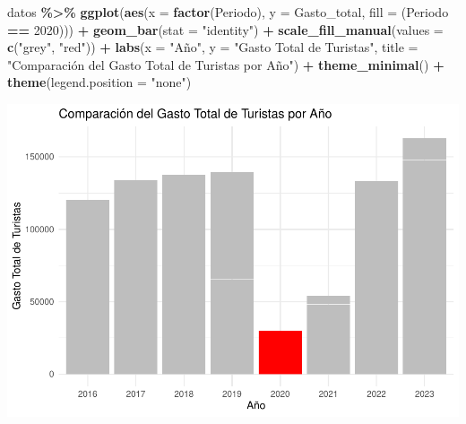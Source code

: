 \documentclass[data,article,submit,moreauthors,pdftex]{Definitions/mdpi}
\newenvironment{Shaded}{\begin{snugshade}}{\end{snugshade}}
\newcommand{\AttributeTok}[1]{\textcolor[rgb]{0.13,0.29,0.53}{#1}}
\newcommand{\DecValTok}[1]{\textcolor[rgb]{0.00,0.00,0.81}{#1}}
\newcommand{\FunctionTok}[1]{\textcolor[rgb]{0.13,0.29,0.53}{\textbf{#1}}}
\newcommand{\NormalTok}[1]{#1}
\newcommand{\SpecialCharTok}[1]{\textcolor[rgb]{0.81,0.36,0.00}{\textbf{#1}}}
\newcommand{\StringTok}[1]{\textcolor[rgb]{0.31,0.60,0.02}{#1}}
\begin{document}
\begin{Shaded}
\begin{Highlighting}[]
\NormalTok{datos }\SpecialCharTok{\%\textgreater{}\%}
    \FunctionTok{ggplot}\NormalTok{(}\FunctionTok{aes}\NormalTok{(}\AttributeTok{x =} \FunctionTok{factor}\NormalTok{(Periodo), }\AttributeTok{y =}\NormalTok{ Gasto\_total, }\AttributeTok{fill =}\NormalTok{ (Periodo }\SpecialCharTok{==}
        \DecValTok{2020}\NormalTok{))) }\SpecialCharTok{+} \FunctionTok{geom\_bar}\NormalTok{(}\AttributeTok{stat =} \StringTok{"identity"}\NormalTok{) }\SpecialCharTok{+} \FunctionTok{scale\_fill\_manual}\NormalTok{(}\AttributeTok{values =} \FunctionTok{c}\NormalTok{(}\StringTok{"grey"}\NormalTok{,}
    \StringTok{"red"}\NormalTok{)) }\SpecialCharTok{+} \FunctionTok{labs}\NormalTok{(}\AttributeTok{x =} \StringTok{"Año"}\NormalTok{, }\AttributeTok{y =} \StringTok{"Gasto Total de Turistas"}\NormalTok{,}
    \AttributeTok{title =} \StringTok{"Comparación del Gasto Total de Turistas por Año"}\NormalTok{) }\SpecialCharTok{+}
    \FunctionTok{theme\_minimal}\NormalTok{() }\SpecialCharTok{+} \FunctionTok{theme}\NormalTok{(}\AttributeTok{legend.position =} \StringTok{"none"}\NormalTok{)}
\end{Highlighting}
\end{Shaded}

\includegraphics{ProyectoAED2024_Rmd_files/figure-latex/unnamed-chunk-24-1.pdf}
\end{document}
